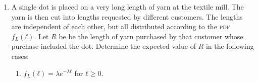 \begin{enumerate}
  Since
  \begin{align*}
    P(\min\{T_1+T_2, S\} > t) &= P(T_1 + T_2 > t) \, P(S > t) \\
                              &= (e^{-λt} + λte^{-λt}) e^{-μt} \\
                              &= (1+λt) e^{-(λ+μ)t}, \\
  \intertext{therefore}
    P(\min\{T_1+T_2, S\} \le t)
                              &= 1 - P(\min\{T_1+T_2, S\} > t) \\
                              &= 1 - (1+λt) e^{-(λ+μ)t}. \\
  \intertext{Take the derivative to get the \textsc{pdf} of \(\min\{T_1+T_2, S\}\),}
    f_{\min\{T_1+T_2, S\}}(t) &= \ddt (1 - (1+λt) e^{-(λ+μ)t}) \\
                              &= -λe^{-(λ+μ)t} + (1+λt)(λ+μ) e^{-(λ+μ)t} \\
                              &= (μ+λ(λ+μ)t) e^{-(λ+μ)t}. \\
    \intertext{Integrate to find the expected value of \(\min\{T_1+T_2, S\}\),}
    \E[\min\{T_1+T_2, S\}]
                              &= \int_0^{+\infty} t \, f_{\min\{T_1+T_2, S\}}(t) \dt \\
                              &= \int_0^{+\infty} (μt+λ(λ+μ)t^2) e^{-(λ+μ)t} \dt \\
                              &= \frac{μ}{λ+μ} \int_0^{+\infty} t \, (λ+μ)e^{-(λ+μ)t} \dt \\
                              &\phantom{{}={}} + λ \int_0^{+∞} t^2 (λ+μ)e^{-(λ+μ)t} \dt \\
                              &= \frac{μ}{(λ+μ)^2} + λ \paren{\frac{1}{(λ+μ)^2} + \paren{\frac{1}{λ+μ}}^2} \\
                              &= \frac{μ+2λ}{(λ+μ)^2}.
  \end{align*}

\item {} A single dot is placed on a very long length of yarn at the
  textile mill.  The yarn is then cut into lengths requested by
  different customers.  The lengths are independent of each other, but
  all distributed according to the \textsc{pdf} \(f_L(ℓ)\).  Let \(R\)
  be be the length of yarn purchased by that customer whose purchase
  included the dot.  Determine the expected value of \(R\) in the
  following cases:
  \begin{enumerate}
  \item {} \(f_L(ℓ) = λe^{−λℓ}\) for \(ℓ \ge 0\).


\end{enumerate}
\end{enumerate}
